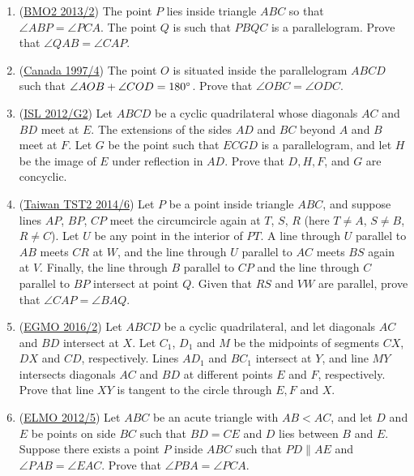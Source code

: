\documentclass[11pt,paper=letter]{scrartcl}
\begin{document}
\begin{enumerate}
  \item (\href{http://www.aops.com/community/c6h518987}{BMO2 2013/2}) The point $P$ lies inside triangle $ABC$ so that $\angle ABP = \angle PCA$. The point $Q$ is such that $PBQC$ is a parallelogram. Prove that $\angle QAB = \angle CAP$.

  \item (\href{https://aops.com/community/c6h405503}{Canada 1997/4}) The point $O$ is situated inside the parallelogram $ABCD$ such that $\angle AOB + \angle COD = 180^\circ$. Prove that $\angle OBC = \angle ODC$. %

  \item (\href{https://aops.com/community/c6h546176}{ISL 2012/G2}) Let $ABCD$ be a cyclic quadrilateral whose diagonals $AC$ and $BD$ meet at $E$. The extensions of the sides $AD$ and $BC$ beyond $A$ and $B$ meet at $F$. Let $G$ be the point such that $ECGD$ is a parallelogram, and let $H$ be the image of $E$ under reflection in $AD$. Prove that $D, H, F$, and $G$ are concyclic.

  \item (\href{http://www.aops.com/community/c6h598540}{Taiwan TST2 2014/6}) Let $P$ be a point inside triangle $ABC$, and suppose lines $AP$, $BP$, $CP$ meet the circumcircle again at $T$, $S$, $R$ (here $T \neq A$, $S \neq B$, $R \neq C$). Let $U$ be any point in the interior of $PT$. A line through $U$ parallel to $AB$ meets $CR$ at $W$, and the line through $U$ parallel to $AC$ meets $BS$ again at $V$. Finally, the line through $B$ parallel to $CP$ and the line through $C$ parallel to $BP$ intersect at point $Q$. Given that $RS$ and $VW$ are parallel, prove that $\angle CAP = \angle BAQ$.

  \item (\href{https://aops.com/community/c6h1226672}{EGMO 2016/2}) Let $ABCD$ be a cyclic quadrilateral, and let diagonals $AC$ and $BD$ intersect at $X$. Let $C_1$, $D_1$ and $M$ be the midpoints of segments $CX$, $DX$ and $CD$, respectively. Lines $AD_1$ and $BC_1$ intersect at $Y$, and line $MY$ intersects diagonals $AC$ and $BD$ at different points $E$ and $F$, respectively. Prove that line $XY$ is tangent to the circle through $E,F$ and $X$.

  \item (\href{https://aops.com/community/c6h486936}{ELMO 2012/5}) Let $ABC$ be an acute triangle with $AB<AC$, and let $D$ and $E$ be points on side $BC$ such that $BD=CE$ and $D$ lies between $B$ and $E$. Suppose there exists a point $P$ inside $ABC$ such that $PD\parallel AE$ and $\angle PAB=\angle EAC$. Prove that $\angle PBA=\angle PCA$.
\end{enumerate}
\end{document}
